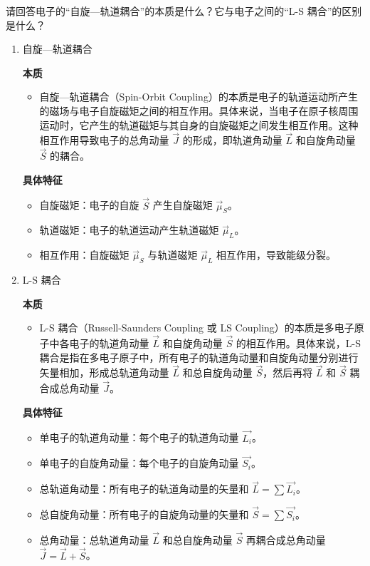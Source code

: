 \documentclass[dvipsnames, svgnames,a4paper,11pt]{article}
\begin{document}
	\begin{question}
		请回答电子的“自旋—轨道耦合”的本质是什么？它与电子之间的“L-S 耦合”的区别是什么？
	\end{question}
	\begin{enumerate}
		\item 自旋—轨道耦合
		
		\textbf{本质}
		\begin{itemize}
			\item 自旋—轨道耦合（Spin-Orbit Coupling）的本质是电子的轨道运动所产生的磁场与电子自旋磁矩之间的相互作用。具体来说，当电子在原子核周围运动时，它产生的轨道磁矩与其自身的自旋磁矩之间发生相互作用。这种相互作用导致电子的总角动量 \( \vec{J} \) 的形成，即轨道角动量 \( \vec{L} \) 和自旋角动量 \( \vec{S} \) 的耦合。
		\end{itemize}
		
		\textbf{具体特征}
		\begin{itemize}
			\item 自旋磁矩：电子的自旋 \( \vec{S} \) 产生自旋磁矩 \( \vec{\mu}_S \)。
			\item 轨道磁矩：电子的轨道运动产生轨道磁矩 \( \vec{\mu}_L \)。
			\item 相互作用：自旋磁矩 \( \vec{\mu}_S \) 与轨道磁矩 \( \vec{\mu}_L \) 相互作用，导致能级分裂。
		\end{itemize}
		
		\item L-S 耦合
		
		\textbf{本质}
		\begin{itemize}
			\item L-S 耦合（Russell-Saunders Coupling 或 LS Coupling）的本质是多电子原子中各电子的轨道角动量 \( \vec{L} \) 和自旋角动量 \( \vec{S} \) 的相互作用。具体来说，L-S 耦合是指在多电子原子中，所有电子的轨道角动量和自旋角动量分别进行矢量相加，形成总轨道角动量 \( \vec{L} \) 和总自旋角动量 \( \vec{S} \)，然后再将 \( \vec{L} \) 和 \( \vec{S} \) 耦合成总角动量 \( \vec{J} \)。
		\end{itemize}
		
		\textbf{具体特征}
		\begin{itemize}
			\item 单电子的轨道角动量：每个电子的轨道角动量 \( \vec{L_i} \)。
			\item 单电子的自旋角动量：每个电子的自旋角动量 \( \vec{S_i} \)。
			\item 总轨道角动量：所有电子的轨道角动量的矢量和 \( \vec{L} = \sum \vec{L_i} \)。
			\item 总自旋角动量：所有电子的自旋角动量的矢量和 \( \vec{S} = \sum \vec{S_i} \)。
			\item 总角动量：总轨道角动量 \( \vec{L} \) 和总自旋角动量 \( \vec{S} \) 再耦合成总角动量 \( \vec{J} = \vec{L} + \vec{S} \)。
		\end{itemize}
		

\end{enumerate}
\end{document}
